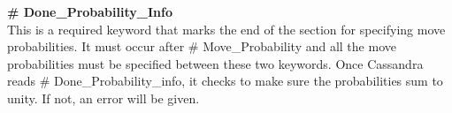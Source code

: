 %
%
%
{\bf \# Done\_Probability\_Info} \\
This is a required keyword that marks the end of the section for specifying move probabilities. It must occur after \# Move\_Probability and all the move probabilities must be specified between these two keywords. Once Cassandra reads \# Done\_Probability\_info, it checks to make sure the probabilities sum to unity. If not, an error will be given.
%
%
%
